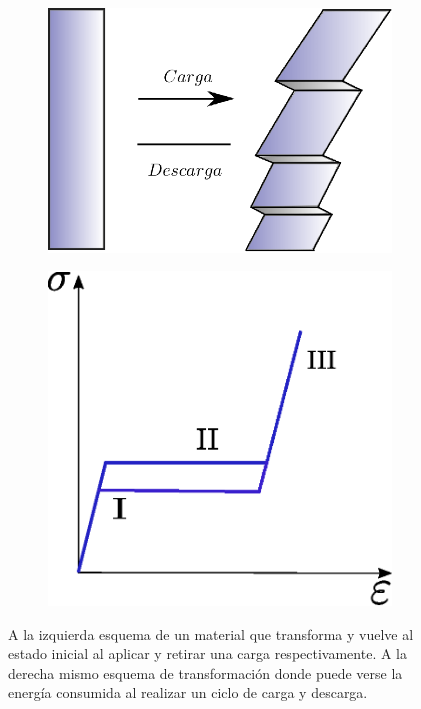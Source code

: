 \documentclass[a4paper,12pt,fleqn,twoside,openany]{book}
\begin{document}
 
 \begin{figure}[h]
 \centering
    \begin{subfigure}{0.49\textwidth}
        \includegraphics[width=\textwidth]{Img/Introduccion/HisteresisEsquema.eps}
        \caption{}
        \label{fig:}
    \end{subfigure}
    \begin{subfigure}{0.45\textwidth}
        \includegraphics[width=\textwidth]{Img/Introduccion/Histeresis.eps}
        \caption{}
        \label{fig:EspA}
    \end{subfigure}

  \label{fig: proceso}
  \caption{A la izquierda esquema de un material que transforma y vuelve al estado inicial al aplicar y retirar una carga respectivamente.
  A la derecha mismo esquema de transformación donde puede verse la energía consumida al realizar un ciclo de carga y descarga.}
\end{figure}
 
\end{document}

